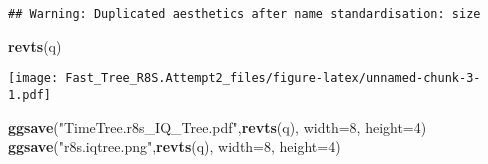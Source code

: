 \documentclass[
]{article}
\newenvironment{Shaded}{\begin{snugshade}}{\end{snugshade}}
\newcommand{\DataTypeTok}[1]{\textcolor[rgb]{0.13,0.29,0.53}{#1}}
\newcommand{\DecValTok}[1]{\textcolor[rgb]{0.00,0.00,0.81}{#1}}
\newcommand{\KeywordTok}[1]{\textcolor[rgb]{0.13,0.29,0.53}{\textbf{#1}}}
\newcommand{\NormalTok}[1]{#1}
\newcommand{\StringTok}[1]{\textcolor[rgb]{0.31,0.60,0.02}{#1}}
\begin{document}
\begin{verbatim}
## Warning: Duplicated aesthetics after name standardisation: size
\end{verbatim}

\begin{Shaded}
\begin{Highlighting}[]
\KeywordTok{revts}\NormalTok{(q)}
\end{Highlighting}
\end{Shaded}

\texttt{[image: Fast\_Tree\_R8S.Attempt2\_files/figure-latex/unnamed-chunk-3-1.pdf]}

\begin{Shaded}
\begin{Highlighting}[]
\KeywordTok{ggsave}\NormalTok{(}\StringTok{"TimeTree.r8s_IQ_Tree.pdf"}\NormalTok{,}\KeywordTok{revts}\NormalTok{(q), }\DataTypeTok{width=}\DecValTok{8}\NormalTok{, }\DataTypeTok{height=}\DecValTok{4}\NormalTok{)}
\KeywordTok{ggsave}\NormalTok{(}\StringTok{"r8s.iqtree.png"}\NormalTok{,}\KeywordTok{revts}\NormalTok{(q), }\DataTypeTok{width=}\DecValTok{8}\NormalTok{, }\DataTypeTok{height=}\DecValTok{4}\NormalTok{)}
\end{Highlighting}
\end{Shaded}
\end{document}
